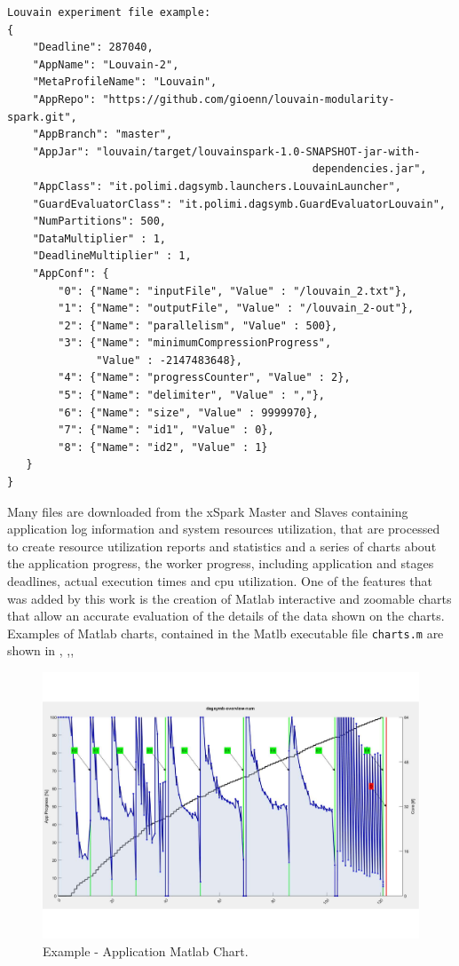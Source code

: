 \begin{verbatim}
Louvain experiment file example:
{
    "Deadline": 287040,
    "AppName": "Louvain-2",
    "MetaProfileName": "Louvain",
    "AppRepo": "https://github.com/gioenn/louvain-modularity-spark.git",
    "AppBranch": "master",
    "AppJar": "louvain/target/louvainspark-1.0-SNAPSHOT-jar-with-
                                                dependencies.jar",
    "AppClass": "it.polimi.dagsymb.launchers.LouvainLauncher",
    "GuardEvaluatorClass": "it.polimi.dagsymb.GuardEvaluatorLouvain",
    "NumPartitions": 500,
    "DataMultiplier" : 1,
    "DeadlineMultiplier" : 1,
    "AppConf": {
        "0": {"Name": "inputFile", "Value" : "/louvain_2.txt"},
        "1": {"Name": "outputFile", "Value" : "/louvain_2-out"},
        "2": {"Name": "parallelism", "Value" : 500},
        "3": {"Name": "minimumCompressionProgress", 
              "Value" : -2147483648},
        "4": {"Name": "progressCounter", "Value" : 2},
        "5": {"Name": "delimiter", "Value" : ","},
        "6": {"Name": "size", "Value" : 9999970},
        "7": {"Name": "id1", "Value" : 0},
        "8": {"Name": "id2", "Value" : 1}      		
   }
}
\end{verbatim}
Many files are downloaded from the xSpark Master and Slaves containing application log information and system resources utilization, that are processed to create resource utilization reports and statistics and a series of charts about the application progress, the worker progress, including application and stages deadlines, actual execution times and cpu utilization. One of the features that was added by this work is the creation of Matlab interactive and zoomable charts that allow an accurate evaluation of the details of the data shown on the charts. Examples of Matlab charts, contained in the Matlb executable file \texttt{charts.m} are shown in , ,,
\begin{figure}[thbp]
	\centering
	\includegraphics[width=\columnwidth]{images/plot_app.pdf}
	\caption{Example - Application Matlab Chart.}
	\label{fig:plot_app}
\end{figure}
